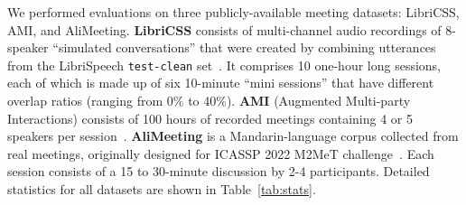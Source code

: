 \documentclass[a4paper]{article}
\begin{document}
\begin{table}[b]
\centering
\caption{Statistics of datasets used for evaluations. LibriCSS does not have a train set. The $k$-speaker durations are in terms of fraction of total speaking time.}
\label{tab:stats}
\end{table}

We performed evaluations on three publicly-available meeting datasets: LibriCSS, AMI, and AliMeeting. \textbf{LibriCSS} consists of multi-channel audio recordings of 8-speaker ``simulated conversations'' that were created by combining utterances from the LibriSpeech \texttt{test-clean} set~\cite{Panayotov2015LibrispeechAA}. It comprises 10 one-hour long sessions, each of which is made up of six 10-minute ``mini sessions'' that have different overlap ratios (ranging from 0\% to 40\%). \textbf{AMI} (Augmented Multi-party Interactions) consists of 100 hours of recorded meetings containing 4 or 5 speakers per session~\cite{Carletta2005TheAM}. \textbf{AliMeeting} is a Mandarin-language corpus collected from real meetings, originally designed for ICASSP 2022 M2MeT challenge~\cite{Yu2022M2MetTI}. Each session consists of a 15 to 30-minute
discussion by 2-4 participants. Detailed statistics for all datasets are shown in Table~\ref{tab:stats}.
\end{document}
